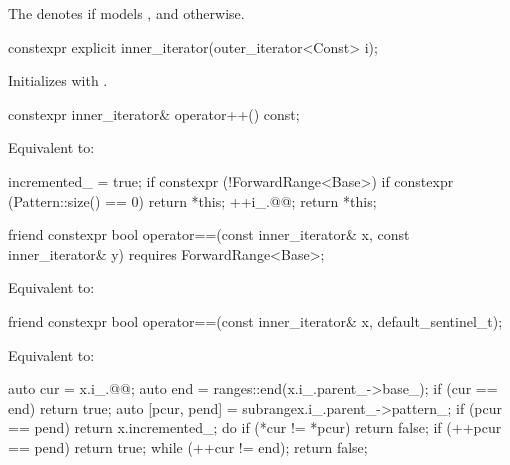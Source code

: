 \pnum
The   denotes
 if
 models
, and 
otherwise.

%
\begin{itemdecl}
constexpr explicit inner_iterator(outer_iterator<Const> i);
\end{itemdecl}

\begin{itemdescr}
\pnum
\effects Initializes  with .
\end{itemdescr}

%
\begin{itemdecl}
constexpr inner_iterator& operator++() const;
\end{itemdecl}

\begin{itemdescr}
\pnum
\effects Equivalent to:
\begin{codeblock}
incremented_ = true;
if constexpr (!ForwardRange<Base>) {
  if constexpr (Pattern::size() == 0) {
    return *this;
  }
}
++i_.@@;
return *this;
\end{codeblock}
\end{itemdescr}

%
\begin{itemdecl}
friend constexpr bool operator==(const inner_iterator& x, const inner_iterator& y)
  requires ForwardRange<Base>;
\end{itemdecl}

\begin{itemdescr}
\pnum
\effects Equivalent to: 
\end{itemdescr}

%
\begin{itemdecl}
friend constexpr bool operator==(const inner_iterator& x, default_sentinel_t);
\end{itemdecl}

\begin{itemdescr}
\pnum
\effects Equivalent to:
\begin{codeblock}
auto cur = x.i_.@@;
auto end = ranges::end(x.i_.parent_->base_);
if (cur == end) return true;
auto [pcur, pend] = subrange{x.i_.parent_->pattern_};
if (pcur == pend) return x.incremented_;
do {
  if (*cur != *pcur) return false;
  if (++pcur == pend) return true;
} while (++cur != end);
return false;
\end{codeblock}
\end{itemdescr}

